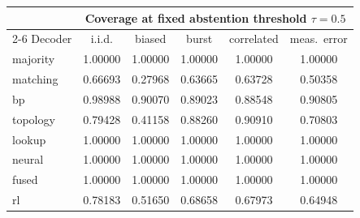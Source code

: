 \begin{tabular}{lccccc}
\toprule
 & \multicolumn{5}{c}{Coverage at fixed abstention threshold $\tau=0.5$} \\
\cmidrule(lr){2-6}
Decoder & i.i.d. & biased & burst & correlated & meas.\ error \\
\midrule
majority  & 1.00000 & 1.00000 & 1.00000 & 1.00000 & 1.00000 \\
matching  & 0.66693 & 0.27968 & 0.63665 & 0.63728 & 0.50358 \\
bp        & 0.98988 & 0.90070 & 0.89023 & 0.88548 & 0.90805 \\
topology  & 0.79428 & 0.41158 & 0.88260 & 0.90910 & 0.70803 \\
lookup    & 1.00000 & 1.00000 & 1.00000 & 1.00000 & 1.00000 \\
neural    & 1.00000 & 1.00000 & 1.00000 & 1.00000 & 1.00000 \\
fused     & 1.00000 & 1.00000 & 1.00000 & 1.00000 & 1.00000 \\
rl        & 0.78183 & 0.51650 & 0.68658 & 0.67973 & 0.64948 \\
\bottomrule
\end{tabular}
